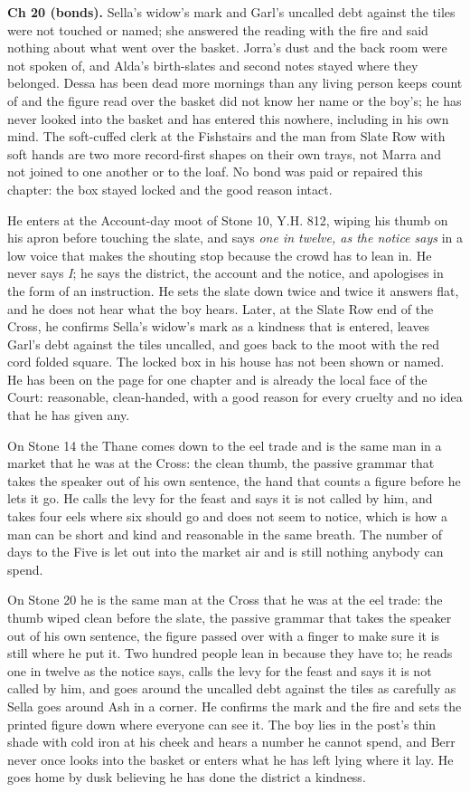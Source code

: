 \documentclass{design/chronicle}
\begin{document}
{\textbf{Ch 20 (bonds).} Sella’s widow’s mark and Garl’s uncalled debt against the tiles were not touched or named; she answered the reading with the fire and said nothing about what went over the basket. Jorra’s dust and the back room were not spoken of, and Alda’s birth-slates and second notes stayed where they belonged. Dessa has been dead more mornings than any living person keeps count of and the figure read over the basket did not know her name or the boy’s; he has never looked into the basket and has entered this nowhere, including in his own mind. The soft-cuffed clerk at the Fishstairs and the man from Slate Row with soft hands are two more record-first shapes on their own trays, not Marra and not joined to one another or to the loaf. No bond was paid or repaired this chapter: the box stayed locked and the good reason intact.

He enters at the Account-day moot of Stone 10, Y.H. 812, wiping his thumb on his apron before touching the slate, and says \emph{one in twelve, as the notice says} in a low voice that makes the shouting stop because the crowd has to lean in. He never says \emph{I}; he says the district, the account and the notice, and apologises in the form of an instruction. He sets the slate down twice and twice it answers flat, and he does not hear what the boy hears. Later, at the Slate Row end of the Cross, he confirms Sella’s widow’s mark as a kindness that is entered, leaves Garl’s debt against the tiles uncalled, and goes back to the moot with the red cord folded square. The locked box in his house has not been shown or named. He has been on the page for one chapter and is already the local face of the Court: reasonable, clean-handed, with a good reason for every cruelty and no idea that he has given any.

On Stone 14 the Thane comes down to the eel trade and is the same man in a market that he was at the Cross: the clean thumb, the passive grammar that takes the speaker out of his own sentence, the hand that counts a figure before he lets it go. He calls the levy for the feast and says it is not called by him, and takes four eels where six should go and does not seem to notice, which is how a man can be short and kind and reasonable in the same breath. The number of days to the Five is let out into the market air and is still nothing anybody can spend.

On Stone 20 he is the same man at the Cross that he was at the eel trade: the thumb wiped clean before the slate, the passive grammar that takes the speaker out of his own sentence, the figure passed over with a finger to make sure it is still where he put it. Two hundred people lean in because they have to; he reads one in twelve as the notice says, calls the levy for the feast and says it is not called by him, and goes around the uncalled debt against the tiles as carefully as Sella goes around Ash in a corner. He confirms the mark and the fire and sets the printed figure down where everyone can see it. The boy lies in the post’s thin shade with cold iron at his cheek and hears a number he cannot spend, and Berr never once looks into the basket or enters what he has left lying where it lay. He goes home by dusk believing he has done the district a kindness.

}
\end{document}
